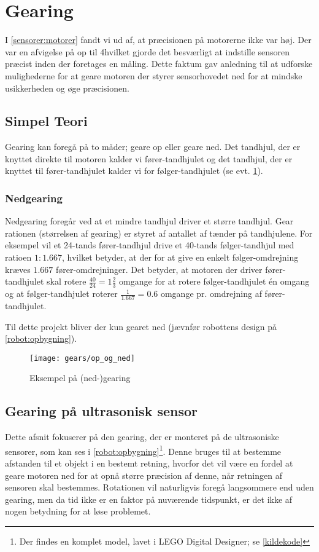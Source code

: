 \section{Gearing}\label{robot:gearing}
I \cref{sensorer:motorer} fandt vi ud af, at præcisionen på motorerne ikke var høj.
Der var en afvigelse på op til 4\dg hvilket gjorde det besværligt at indstille sensoren præcist inden der foretages en måling.
Dette faktum gav anledning til at udforske mulighederne for at geare motoren der styrer sensorhovedet ned for at mindske usikkerheden og øge præcisionen.

\subsection{Simpel Teori}\label{gearing:simpel_teori}
Gearing kan foregå på to måder; geare op eller geare ned.
Det tandhjul, der er knyttet direkte til motoren kalder vi fører-tandhjulet og det tandhjul, der er knyttet til fører-tandhjulet kalder vi for følger-tandhjulet (se evt. \cref{gearing:nedgearing}).

\subsubsection{Nedgearing}
Nedgearing foregår ved at et mindre tandhjul driver et større tandhjul.
Gear rationen (størrelsen af gearing) er styret af antallet af tænder på tandhjulene.
For eksempel vil et 24-tands fører-tandhjul drive et 40-tands følger-tandhjul med ratioen $1:1.667$, hvilket betyder, at der for at give en enkelt følger-omdrejning kræves $1.667$ fører-omdrejninger. 
Det betyder, at motoren der driver fører-tandhjulet skal rotere $\frac{40}{24} = 1 \frac{2}{3}$ omgange for at rotere følger-tandhjulet én omgang og at følger-tandhjulet roterer $\frac{1}{1.667} = 0.6$ omgange pr. omdrejning af fører-tandhjulet.

Til dette projekt bliver der kun gearet ned (jævnfør robottens design på \cref{robot:opbygning}).


\begin{figure}[h]
\centering
\texttt{[image: gears/op\_og\_ned]}
\caption{Eksempel på (ned-)gearing}
\label{gearing:nedgearing}
\end{figure}

\subsection{Gearing på ultrasonisk sensor}
Dette afsnit fokuserer på den gearing, der er monteret på de ultrasoniske sensorer, som kan ses i \cref{robot:opbygning}\renewcommand{\thefootnote}{\fnsymbol{footnote}}\footnote{Der findes en komplet model, lavet i LEGO Digital Designer; se \cref{kildekode}}.
Denne bruges til at bestemme afstanden til et objekt i en bestemt retning, hvorfor det vil være en fordel at geare motoren ned for at opnå større præcision af denne, når retningen af sensoren skal bestemmes.
Rotationen vil naturligvis foregå langsommere end uden gearing, men da tid ikke er en faktor på nuværende tidspunkt, er det ikke af nogen betydning for at løse problemet.


